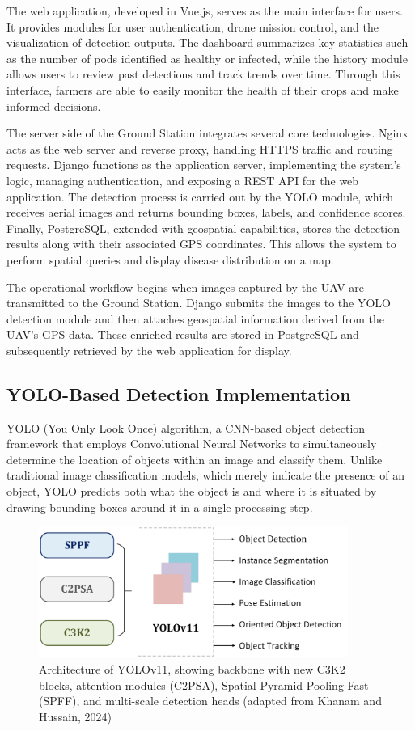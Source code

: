 The web application, developed in Vue.js, serves as the main interface for users. It provides modules for user authentication, drone mission control, and the visualization of detection outputs. The dashboard summarizes key statistics such as the number of pods identified as healthy or infected, while the history module allows users to review past detections and track trends over time. Through this interface, farmers are able to easily monitor the health of their crops and make informed decisions.

The server side of the Ground Station integrates several core technologies. Nginx acts as the web server and reverse proxy, handling HTTPS traffic and routing requests. Django functions as the application server, implementing the system’s logic, managing authentication, and exposing a REST API for the web application. The detection process is carried out by the YOLO module, which receives aerial images and returns bounding boxes, labels, and confidence scores. Finally, PostgreSQL, extended with geospatial capabilities, stores the detection results along with their associated GPS coordinates. This allows the system to perform spatial queries and display disease distribution on a map.

The operational workflow begins when images captured by the UAV are transmitted to the Ground Station. Django submits the images to the YOLO detection module and then attaches geospatial information derived from the UAV’s GPS data. These enriched results are stored in PostgreSQL and subsequently retrieved by the web application for display.

\subsection{YOLO-Based Detection Implementation}
YOLO (You Only Look Once) algorithm, a CNN-based object detection framework that employs Convolutional Neural Networks to simultaneously determine the location of objects within an image and classify them. Unlike traditional image classification models, which merely indicate the presence of an object, YOLO predicts both what the object is and where it is situated by drawing bounding boxes around it in a single processing step.

\begin{figure}[H]
	\centering
	\caption{Architecture of YOLOv11, showing backbone with new C3K2 blocks, attention modules (C2PSA), Spatial Pyramid Pooling Fast (SPFF), and multi-scale detection heads (adapted from Khanam and Hussain, 2024)}
	\label{fig:yolov11_architecture}
	\includegraphics[width=0.9\textwidth]{figures/yolov11.pdf}
\end{figure}

